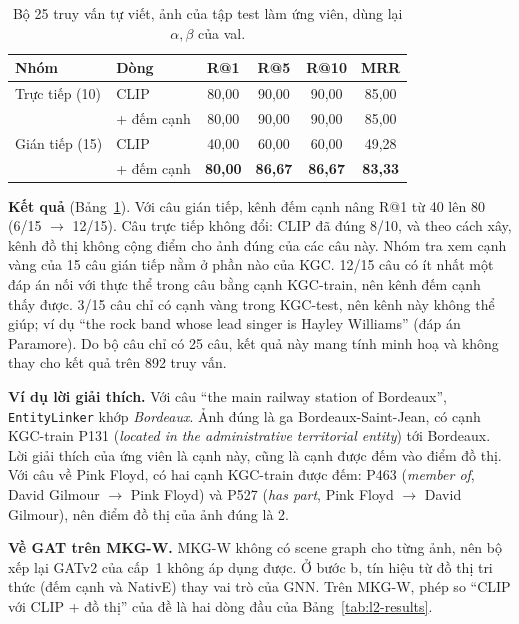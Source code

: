 \begin{table}[t]
\centering
\caption{Bộ 25 truy vấn tự viết, ảnh của tập test làm ứng viên, dùng lại $\alpha,\beta$ của val.}
\label{tab:l2-hand}
\footnotesize
\setlength{\tabcolsep}{3pt}
\begin{tabular}{llcccc}
\toprule
Nhóm & Dòng & R@1 & R@5 & R@10 & MRR \\
\midrule
Trực tiếp (10) & CLIP & 80,00 & 90,00 & 90,00 & 85,00 \\
 & + đếm cạnh & 80,00 & 90,00 & 90,00 & 85,00 \\
Gián tiếp (15) & CLIP & 40,00 & 60,00 & 60,00 & 49,28 \\
 & + đếm cạnh & \textbf{80,00} & \textbf{86,67} & \textbf{86,67} & \textbf{83,33} \\
\bottomrule
\end{tabular}
\end{table}

\textbf{Kết quả} (Bảng~\ref{tab:l2-hand}). Với câu gián tiếp, kênh đếm cạnh nâng R@1 từ 40 lên 80 (6/15 $\to$ 12/15). Câu
trực tiếp không đổi: CLIP đã đúng 8/10, và theo cách xây, kênh đồ thị không cộng điểm cho ảnh đúng của các câu này. Nhóm tra
xem cạnh vàng của 15 câu gián tiếp nằm ở phần nào của KGC. 12/15 câu có ít nhất một đáp án nối với thực thể trong câu bằng
cạnh KGC-train, nên kênh đếm cạnh thấy được. 3/15 câu chỉ có cạnh vàng trong KGC-test, nên kênh này không thể giúp; ví dụ
``the rock band whose lead singer is Hayley Williams'' (đáp án Paramore). Do bộ câu chỉ có 25 câu, kết quả này mang tính
minh hoạ và không thay cho kết quả trên 892 truy vấn.

\textbf{Ví dụ lời giải thích.} Với câu ``the main railway station of Bordeaux'', \texttt{EntityLinker} khớp
\emph{Bordeaux}. Ảnh đúng là ga Bordeaux-Saint-Jean, có cạnh KGC-train P131 (\emph{located in the administrative territorial
entity}) tới Bordeaux. Lời giải thích của ứng viên là cạnh này, cũng là cạnh được đếm vào điểm đồ thị. Với câu về Pink
Floyd, có hai cạnh KGC-train được đếm: P463 (\emph{member of}, David Gilmour $\to$ Pink Floyd) và P527 (\emph{has part},
Pink Floyd $\to$ David Gilmour), nên điểm đồ thị của ảnh đúng là 2. 

\textbf{Về GAT trên MKG-W.} MKG-W không có scene graph cho từng ảnh, nên bộ xếp lại GATv2 của cấp~1 không áp dụng được. Ở
bước b, tín hiệu từ đồ thị tri thức (đếm cạnh và NativE) thay vai trò của GNN. Trên MKG-W, phép so ``CLIP với CLIP + đồ thị''
của đề là hai dòng đầu của Bảng~\ref{tab:l2-results}.
